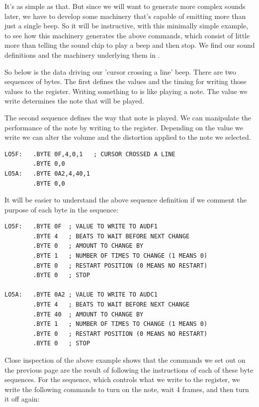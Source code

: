 It's as simple as that. But since we will want to generate more complex sounds later, we
have to develop some machinery that's capable of emitting more than just a single beep.
So it will be instructive, with this minimally simple example, to see how this machinery
generates the above commands, which consist of little more than telling the sound chip
to play a beep and then stop. We find our sound definitions and the machinery underlying
them in .

So below is the data driving our 'cursor crossing a line' beep. There are two sequences of bytes.
The first defines the values and the timing for writing those values to the 
register. Writing something to  is like playing a note. The value we write 
determines the note that will be played.

The second sequence defines the way that note is played. We can manipulate the performance
of the note by writing to the  register. Depending on the value we write we
can alter the volume and the distortion applied to the note we selected.

\begin{lstlisting}
LO5F:   .BYTE 0F,4,0,1   ; CURSOR CROSSED A LINE
        .BYTE 0,0
LO5A:   .BYTE 0A2,4,40,1
        .BYTE 0,0
\end{lstlisting}

It will be easier to understand the above sequence definition if we comment the purpose
of each byte in the sequence:
\begin{lstlisting}
LO5F:   .BYTE 0F  ; VALUE TO WRITE TO AUDF1
        .BYTE 4   ; BEATS TO WAIT BEFORE NEXT CHANGE
        .BYTE 0   ; AMOUNT TO CHANGE BY
        .BYTE 1   ; NUMBER OF TIMES TO CHANGE (1 MEANS 0)
        .BYTE 0   ; RESTART POSITION (0 MEANS NO RESTART) 
        .BYTE 0   ; STOP

LO5A:   .BYTE 0A2 ; VALUE TO WRITE TO AUDC1
        .BYTE 4   ; BEATS TO WAIT BEFORE NEXT CHANGE
        .BYTE 40  ; AMOUNT TO CHANGE BY
        .BYTE 1   ; NUMBER OF TIMES TO CHANGE (1 MEANS 0)
        .BYTE 0   ; RESTART POSITION (0 MEANS NO RESTART) 
        .BYTE 0   ; STOP
\end{lstlisting}

Close inspection of the above example shows that the commands we set out on the previous page
are the result of following the instructions of each of these byte sequences. For the 
sequence, which controls what we write to the  register, we write the following commands
to turn on the note, wait 4 frames, and then turn it off again:

